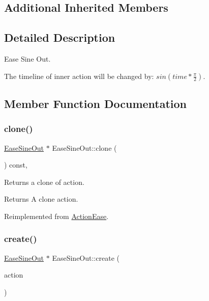\subsection*{Additional Inherited Members}


\subsection{Detailed Description}
Ease Sine Out. 

The timeline of inner action will be changed by\+: $sin(time*\frac { \pi }{ 2 } )$. 

\subsection{Member Function Documentation}
\mbox{\label{classEaseSineOut_ae364e7d3ac055bea87dc624642709fd6}} 
\subsubsection{\texorpdfstring{clone()}{clone()}}
{\footnotesize\ttfamily \hyperlink{classEaseSineOut}{Ease\+Sine\+Out} $\ast$ Ease\+Sine\+Out\+::clone (\begin{DoxyParamCaption}\item[{void}]{ }\end{DoxyParamCaption}) const\hspace{0.3cm}{\ttfamily [override]}, {\ttfamily [virtual]}}

Returns a clone of action.

\begin{DoxyReturn}{Returns}
A clone action. 
\end{DoxyReturn}


Reimplemented from \hyperlink{classActionEase_a39bec93fe161fb732a74d8e51a2fe08b}{Action\+Ease}.

\mbox{\label{classEaseSineOut_aab4dbc2d5f658e13eef3ec8c026efab7}} 
\subsubsection{\texorpdfstring{create()}{create()}}
{\footnotesize\ttfamily \hyperlink{classEaseSineOut}{Ease\+Sine\+Out} $\ast$ Ease\+Sine\+Out\+::create (\begin{DoxyParamCaption}\item[{\hyperlink{classActionInterval}{Action\+Interval} $\ast$}]{action }\end{DoxyParamCaption})\hspace{0.3cm}{\ttfamily [static]}}



